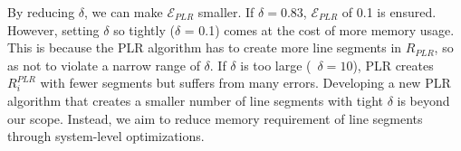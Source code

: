 By reducing $\delta$, we can make $\mathcal{E}_{PLR}$ smaller.  If
$\delta = 0.83$, $\mathcal{E}_{PLR}$ of 0.1 is ensured.  However, setting
$\delta$ so tightly ($\delta$ = 0.1) comes at the cost of more memory
usage.  This is because the PLR algorithm has to create more line
segments in $R_{PLR}$, so as not to violate a narrow range of $\delta$.  
If $\delta$ is too large (\eg~$\delta = 10$), 
PLR creates $R_i^{PLR}$ with fewer segments but suffers from many errors. 
Developing a new PLR
algorithm that creates a smaller number of line segments with tight $\delta$
is beyond our scope.  Instead, we aim to reduce memory
requirement of line segments through system-level optimizations.



    

